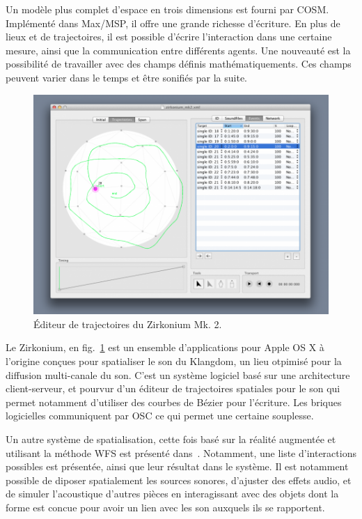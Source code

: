 \documentclass[french,12pt]{article}
\begin{document}

Un modèle plus complet d'espace en trois dimensions est fourni par COSM\cite{wakefield_cosm:_2011}.
Implémenté dans Max/MSP, il offre une grande richesse d'écriture.
En plus de lieux et de trajectoires, il est possible d'écrire l'interaction dans une certaine mesure, 
ainsi que la communication entre différents agents.
Une nouveauté est la possibilité de travailler avec des champs définis mathématiquements. 
Ces champs peuvent varier dans le temps et être sonifiés par la suite.

\begin{figure}[h]
    \centering
    \includegraphics[scale=0.35]{images/zirkonium.png}
    \caption{Éditeur de trajectoires du Zirkonium Mk. 2.}
    \label{fig.zirkonium}
\end{figure}

Le Zirkonium, en fig.~\ref{fig.zirkonium} est un ensemble d'applications pour Apple OS X à l'origine conçues pour spatialiser le son du Klangdom, un lieu otpimisé pour la diffusion multi-canale du son. C'est un système logiciel basé sur une architecture client-serveur, et pourvur d'un éditeur de trajectoires spatiales pour le son qui permet notamment d'utiliser des courbes de Bézier pour l'écriture\cite{wagner_introducing_2014}. Les briques logicielles communiquent par OSC ce qui permet une certaine souplesse.

Un autre système de spatialisation, cette fois basé sur la réalité augmentée et utilisant la méthode \ac{WFS} est présenté dans~\cite{melchior_authoring_2005}. Notamment, une liste d'interactions possibles est présentée, ainsi que leur résultat dans le système. Il est notamment possible de diposer spatialement les sources sonores, d'ajuster des effets audio, et de simuler l'acoustique d'autres pièces en interagissant avec des objets dont la forme est concue pour avoir un lien avec les son auxquels ils se rapportent.
\end{document}
